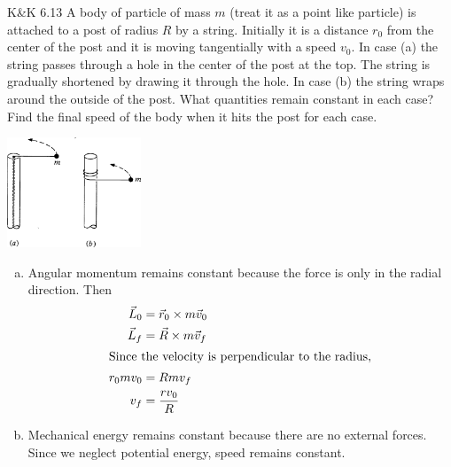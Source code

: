 \documentclass{esg8012pset}
\begin{document}
\begin{problem}{K\&K 6.13}
  A body of particle of mass $m$ (treat it as a point like particle) is attached to a post of radius $R$ by a string. Initially it is a distance $r_0$ from the center of the post and it is moving tangentially with a speed $v_0$. In case (a) the string passes through a hole in the center of the post at the top. The string is gradually shortened by drawing it through the hole. In case (b) the string wraps around the outside of the post. What quantities remain constant in each case? Find the final speed of the body when it hits the post for each case.
  \begin{center}\includegraphics[width=0.3\textwidth]{ps08_5}\end{center}
\end{problem}
\begin{solution}
  \begin{enumerate}[(a)]
    \item Angular momentum remains constant because the force is only in the radial direction.  Then \begin{align*}
      \vec L_0 & = \vec r_0 \times m \vec v_0 \\
      \vec L_f & = \vec R \times m\vec v_f \\
      \intertext{Since the velocity is perpendicular to the radius,}
      r_0 m v_0 & = R m v_f \\
      v_f & = \frac{r v_0}{R}
    \end{align*}
    \item Mechanical energy remains constant because there are no external forces.  Since we neglect potential energy, speed remains constant.
  \end{enumerate}
\end{solution}
\end{document}
